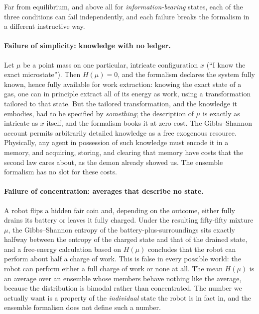 \documentclass[10pt]{article}
\theoremstyle{definition}
\theoremstyle{remark}
\begin{document}
Far from equilibrium, and above all for \emph{information-bearing} states, each of the three conditions can fail independently, and each failure breaks the formalism in a different instructive way.

\paragraph{Failure of simplicity: knowledge with no ledger.} Let $\mu$ be a point mass on one particular, intricate configuration $x$ (``I know the exact microstate''). Then $H(\mu) = 0$, and the formalism declares the system fully known, hence fully available for work extraction: knowing the exact state of a gas, one can in principle extract all of its energy as work, using a transformation tailored to that state. But the tailored transformation, and the knowledge it embodies, had to be specified by \emph{something}; the description of $\mu$ is exactly as intricate as $x$ itself, and the formalism books it at zero cost. The Gibbs--Shannon account permits arbitrarily detailed knowledge as a free exogenous resource. Physically, any agent in possession of such knowledge must encode it in a memory, and acquiring, storing, and clearing that memory have costs that the second law cares about, as the demon already showed us. The ensemble formalism has no slot for these costs.

\paragraph{Failure of concentration: averages that describe no state.} A robot flips a hidden fair coin and, depending on the outcome, either fully drains its battery or leaves it fully charged. Under the resulting fifty-fifty mixture $\mu$, the Gibbs--Shannon entropy of the battery-plus-surroundings sits exactly halfway between the entropy of the charged state and that of the drained state, and a free-energy calculation based on $H(\mu)$ concludes that the robot can perform about half a charge of work. This is false in every possible world: the robot can perform either a full charge of work or none at all. The mean $H(\mu)$ is an average over an ensemble whose members behave nothing like the average, because the distribution is bimodal rather than concentrated. The number we actually want is a property of the \emph{individual} state the robot is in fact in, and the ensemble formalism does not define such a number.
\end{document}
